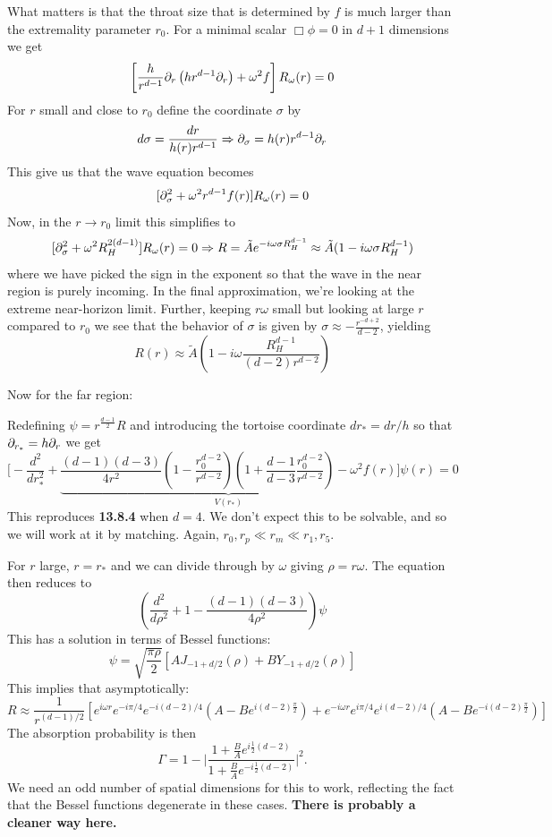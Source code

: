 \documentclass[11pt, class=article, crop=false]{standalone}
\begin{document}
\begin{enumerate}
	 What matters is that the throat size that is determined by $f$ is much larger than the extremality parameter $r_0$. For a minimal scalar $\Box \phi = 0$ in $d+1$ dimensions we get
	\[
		\left[\frac{h}{r^{d-1}} \partial_r \left(h r^{d-1} \partial_r \right) + \omega^2 f \right] R_\omega (r) = 0
	\]
	For $r$ small and close to $r_0$ define the coordinate $\sigma$ by
	\[
		d\sigma = \frac{dr}{h(r) r^{d-1}} \Rightarrow \partial_\sigma = h(r) r^{d-1} \partial_r
	\]
	This give us that the wave equation becomes
	\[
		[\partial_\sigma^2 + \omega^2 r^{d-1} f(r)] R_\omega (r) = 0
	\]
	Now, in the $r \to r_0$ limit this simplifies to
	\[
		[\partial_\sigma^2 + \omega^2 R_H^{2(d-1)}] R_\omega(r) = 0 \Rightarrow R = \tilde A e^{-i \omega \sigma R_H^{d-1}} \approx \tilde A ( 1 - i \omega \sigma R_H^{d-1})
	\]
	where we have picked the sign in the exponent so that the wave in the near region is purely incoming. In the final approximation, we're looking at the extreme near-horizon limit. Further, keeping $r \omega$ small but looking at large $r$ compared to $r_0$ we see that the behavior of $\sigma$ is given by $\sigma \approx -\frac{r^{-d+2}}{d-2}$, yielding 
	\begin{equation}\label{eq:near_zone}
		 R(r) \approx \tilde A (1 - i \omega \frac{R_H^{d-1}}{(d-2) r^{d-2}})
	\end{equation}
	
	Now for the far region:
	
	Redefining $\psi = r^{\frac{d-1}{2}} R$ and introducing the tortoise coordinate $dr_* = dr/h$ so that $\partial_{r_*} = h \partial_r$ we get
	\[
		\Big[- \frac{d^2}{dr_*^2} + \underbrace{\frac{(d-1)(d-3)}{4 r^2} \left(1 - \frac{r_0^{d-2}}{r^{d-2}} \right) \left(1+ \frac{d-1}{d-3} \frac{r_0^{d-2}}{r^{d-2}}\right) - \omega^2 f(r)}_{V(r_*)} \Big] \psi(r) = 0
	\]
	This reproduces \textbf{13.8.4} when $d=4$.
	We don't expect this to be solvable, and so we will work at it by matching. Again, $r_0, r_p \ll r_m \ll r_1, r_5$.

	For $r$ large, $r = r_*$ and we can divide through by $\omega$ giving $\rho = r \omega$. The equation then reduces to
	\[
		\left(\frac{d^2}{d\rho^2} + 1 - \frac{(d-1)(d-3)}{4 \rho^2} \right) \psi
	\]
	This has a solution in terms of Bessel functions:
	\[
		\psi = \sqrt{\frac{\pi \rho}{2}} [A J_{-1+d/2} (\rho) + B Y_{-1+d/2} (\rho)]
	\]
	This implies that asymptotically:
	\[
	  R \approx \frac{1}{r^{(d-1)/2}} [e^{i \omega r} e^{-i \pi/4} e^{-i (d-2)/4} (A - B e^{i (d-2)  \frac \pi2}) + e^{-i \omega r} e^{i \pi/4} e^{i (d-2)/4} (A - B e^{-i (d-2)  \frac \pi2})]
	  \]
  	The absorption probability is then
  	\[
  		\Gamma = 1 - \Bigg|\frac{1 + \frac{B}{A} e^{i \frac12 (d-2)}}{1 + \frac{B}{A} e^{-i\frac12 (d-2)}} \Bigg|^2.
  	\]
	We need an odd number of spatial dimensions for this to work, reflecting the fact that the Bessel functions degenerate in these cases. \textbf{There is probably a cleaner way here.}
	  

\end{enumerate}
\end{document}
